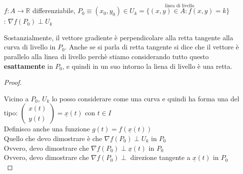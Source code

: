 \documentclass[a4paper, oneside]{article}
\newcommand\R{\mathbb{R}}
\begin{document}
    
\begin{theorem}
   $f:A \to \R$ differenziabile, $P_0 \equiv (x_0,y_0) \in \overset{\text{linea di livello}}{U_k = \{ (x,y) \in A : f(x,y) = k\}}$\\
  : $\nabla f(P_0) \perp U_k$
\end{theorem}\noindent
Sostanzialmente, il vettore gradiente è perpendicolare alla retta tangente alla curva di livello in $P_0$. Anche se si parla di retta tangente si dice che 
il vettore è parallelo alla linea di livello perchè stiamo considerando tutto questo \textbf{esattamente} in $P_0$, e quindi in un suo intorno la liena di livello è una retta.\\ 
\begin{proof}
  \hfill\\
  \begin{center}
  \end{center}\noindent
  Vicino a $P_0$, $U_k$ lo posso considerare come una curva e quindi ha forma una del tipo: $\begin{pmatrix}
    x(t) \\
    y(t)
  \end{pmatrix} = \underline{x}(t)$ con $t \in I$\\
  Definisco anche una funzione $g(t) = f(\underline{x}(t))$\\
  Quello che devo dimostrare è che $\nabla f(P_0) \perp U_k$ in $P_0$\\
  Ovvero, devo dimostrare che $\nabla f(P_0) \perp \underline{x}(t)$ in $P_0$\\
  Ovvero, devo dimostrare che $\nabla f(P_0) \perp$ direzione tangente a $\underline{x}(t)$ in $P_0$\\

\end{proof}
\end{document}
